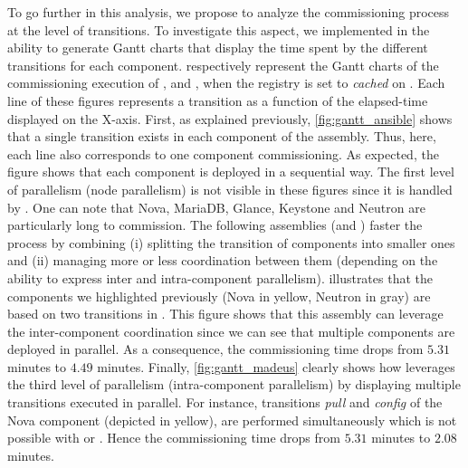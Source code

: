 To go further in this analysis, we propose to analyze the commissioning process
at the level of transitions. To investigate this aspect, we implemented in \mad
the ability to generate Gantt charts that display the time spent by the
different transitions for each component.
 respectively
represent the Gantt charts of the commissioning execution of \ansass,
\aeoass and \madass, when the registry is set to \emph{cached} on
\ecotype. Each line of these figures represents a transition as a function of
the elapsed-time displayed on the X-axis.
First, as explained previously, \cref{fig:gantt_ansible} shows that a single
transition exists in each component of the \ansass assembly. Thus, here,
each line also corresponds to one component commissioning. As expected, the
figure shows that each component is deployed in a sequential way. The first
level of parallelism (\ie node parallelism) is not visible in these figures
since it is handled by \ansible. One can note that Nova, MariaDB, Glance,
Keystone and Neutron are particularly long to commission. The following
assemblies (\ie \aeoass and \madass) faster the process by combining
(i) splitting the transition of components into smaller ones and (ii) managing
more or less coordination between them (depending on the ability to express
inter and intra-component parallelism).
%
 illustrates that the components we highlighted
previously (\eg Nova in yellow, Neutron in gray) are based on two transitions in
\aeoass. This figure shows that this assembly can leverage the
inter-component coordination since we can see that multiple components are
deployed in parallel. As a consequence, the commissioning time drops from $5.31$
minutes to $4.49$ minutes.
%
Finally, \cref{fig:gantt_madeus} clearly shows how \mad leverages the third
level of parallelism (\ie intra-component parallelism) by displaying multiple
transitions executed in parallel. For instance, transitions \emph{pull} and
\emph{config} of the Nova component (depicted in yellow), are performed
simultaneously which is not possible with \ansible or \aeolus. Hence the
commissioning time drops from $5.31$ minutes to $2.08$ minutes.
%

